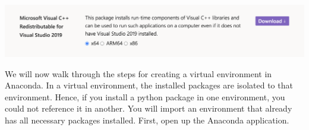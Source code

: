 \documentclass[11 pt]{article}
\begin{document}
\begin{center}
\includegraphics[scale=0.4]{images/vs_download}
\end{center}

We will now walk through the steps for creating a virtual environment in Anaconda. In a virtual environment, the installed packages are isolated to that environment. Hence, if you install a python package in one environment, you could not reference it in another. You will import an environment that already has all necessary packages installed. First, open up the Anaconda application.
\end{document}
